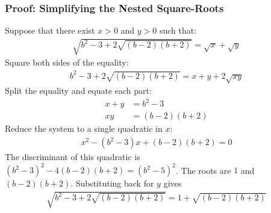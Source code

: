 \subsubsection*{Proof: Simplifying the Nested Square-Roots}
Suppose that there exist $x>0$ and $y>0$ such that:
\begin{align*}
\sqrt{b^{2}-3+2\sqrt{(b-2)(b+2)}}
= \sqrt{x} + \sqrt{y}
\end{align*}
Square both sides of the equality:
\begin{align*}
b^{2}-3+2\sqrt{(b-2)(b+2)}
= x + y + 2\sqrt{xy}
\end{align*}
Split the equality and equate each part:
\begin{align*}
x + y & = b^{2}-3
\\
x y & = (b-2)(b+2)
\end{align*}
Reduce the system to a single quadratic in $x$:
\begin{align*}
x^{2} - (b^{2}-3) x + (b-2)(b+2) = 0
\end{align*}
The discriminant of this quadratic is ${(b^{2}-3)^{2}-4(b-2)(b+2)=(b^{2}-5)^{2}}$. The roots are $1$ and $(b-2)(b+2)$. Substituting back for $y$ gives
\begin{align*}
\sqrt{b^{2}-3+2\sqrt{(b-2)(b+2)}}
= 1 + \sqrt{(b-2)(b+2)}
\end{align*}
